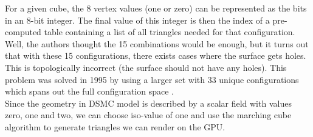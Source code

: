 For a given cube, the 8 vertex values (one or zero) can be represented as the bits in an 8-bit integer. The final value of this integer is then the index of a pre-computed table containing a list of all triangles needed for that configuration. Well, the authors thought the 15 combinations would be enough, but it turns out that with these 15 configurations, there exists cases where the surface gets holes. This is topologically incorrect (the surface should not have any holes). This problem was solved in 1995 by using a larger set with 33 unique configurations which spans out the full configuration space \cite{chernyaev1995marching}.\\
Since the geometry in DSMC model is described by a scalar field with values zero, one and two, we can choose iso-value of one and use the marching cube algorithm to generate triangles we can render on the GPU. 